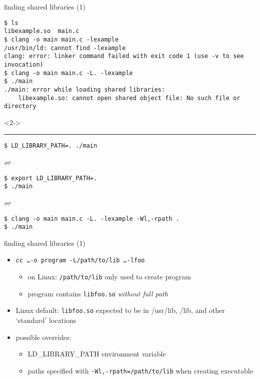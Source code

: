 \begin{frame}[fragile,label=sharedLib]{finding shared libraries (1)}
\begin{Verbatim}[fontsize=\fontsize{12}{13}\selectfont]
$ ls
libexample.so  main.c
$ clang -o main main.c -lexample
/usr/bin/ld: cannot find -lexample
clang: error: linker command failed with exit code 1 (use -v to see invocation)
$ clang -o main main.c -L. -lexample
$ ./main
./main: error while loading shared libraries:
    libexample.so: cannot open shared object file: No such file or directory
\end{Verbatim}
\begin{visibleenv}<2->
\hrule
\begin{Verbatim}[fontsize=\fontsize{12}{13}\selectfont]
$ LD_LIBRARY_PATH=. ./main
\end{Verbatim}
\textit{or}
\begin{Verbatim}[fontsize=\fontsize{12}{13}\selectfont]
$ export LD_LIBRARY_PATH=.
$ ./main
\end{Verbatim}
\textit{or}
\begin{Verbatim}[fontsize=\fontsize{12}{13}\selectfont]
$ clang -o main main.c -L. -lexample -Wl,-rpath .
$ ./main
\end{Verbatim}
\end{visibleenv}
\end{frame}

\begin{frame}{finding shared libraries (1)}
    \begin{itemize}
    \item \texttt{\textit{cc} \ldots -o program -L/path/to/lib \ldots -lfoo}
        \begin{itemize}
        \item on Linux: \texttt{/path/to/lib} only used to create program
        \item program contains \texttt{libfoo.so} \textit{without full path}
        \end{itemize}
    \item Linux default: \texttt{libfoo.so} expected to be in /usr/lib, /lib, and other `standard' locations
    \item possible overrides:
        \begin{itemize}
        \item LD\_LIBRARY\_PATH environment variable
        \item paths specified with \texttt{-Wl,-rpath=/path/to/lib} when creating executable
        \end{itemize}
    \end{itemize}
\end{frame}

